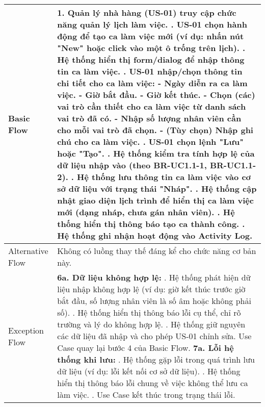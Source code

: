 \begin{longtable}{|m{4cm}|p{11cm}|}
Basic Flow & 1. Quản lý nhà hàng (US-01) truy cập chức năng quản lý lịch làm việc. \newline 2. US-01 chọn hành động để tạo ca làm việc mới (ví dụ: nhấn nút "New" hoặc click vào một ô trống trên lịch). \newline 3. Hệ thống hiển thị form/dialog để nhập thông tin ca làm việc. \newline 4. US-01 nhập/chọn thông tin chi tiết cho ca làm việc: \newline    - Ngày diễn ra ca làm việc. \newline    - Giờ bắt đầu. \newline    - Giờ kết thúc. \newline    - Chọn (các) vai trò cần thiết cho ca làm việc từ danh sách vai trò đã có. \newline    - Nhập số lượng nhân viên cần cho mỗi vai trò đã chọn. \newline    - (Tùy chọn) Nhập ghi chú cho ca làm việc. \newline 5. US-01 chọn lệnh "Lưu" hoặc "Tạo". \newline 6. Hệ thống kiểm tra tính hợp lệ của dữ liệu nhập vào (theo BR-UC1.1-1, BR-UC1.1-2). \newline 7. Hệ thống lưu thông tin ca làm việc vào cơ sở dữ liệu với trạng thái "Nháp". \newline 8. Hệ thống cập nhật giao diện lịch trình để hiển thị ca làm việc mới (dạng nháp, chưa gán nhân viên). \newline 9. Hệ thống hiển thị thông báo tạo ca thành công. \newline 10. Hệ thống ghi nhận hoạt động vào Activity Log. \\
\hline
Alternative Flow & Không có luồng thay thế đáng kể cho chức năng cơ bản này. \\
\hline
Exception Flow & \textbf{6a. Dữ liệu không hợp lệ:} \newline    1. Hệ thống phát hiện dữ liệu nhập không hợp lệ (ví dụ: giờ kết thúc trước giờ bắt đầu, số lượng nhân viên là số âm hoặc không phải số). \newline    2. Hệ thống hiển thị thông báo lỗi cụ thể, chỉ rõ trường và lý do không hợp lệ. \newline    3. Hệ thống giữ nguyên các dữ liệu đã nhập và cho phép US-01 chỉnh sửa. Use Case quay lại bước 4 của Basic Flow. \newline \textbf{7a. Lỗi hệ thống khi lưu:} \newline    1. Hệ thống gặp lỗi trong quá trình lưu dữ liệu (ví dụ: lỗi kết nối cơ sở dữ liệu). \newline    2. Hệ thống hiển thị thông báo lỗi chung về việc không thể lưu ca làm việc. \newline    3. Use Case kết thúc trong trạng thái lỗi. \\

\end{longtable}
